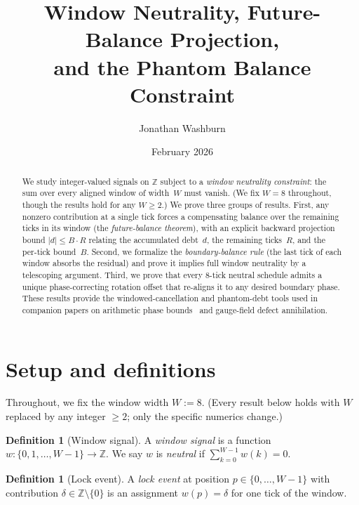 \documentclass[11pt]{amsart}
\title[Window Neutrality and Phantom Balance]{Window Neutrality, Future-Balance Projection,\\
and the Phantom Balance Constraint}
\author{Jonathan Washburn}
\date{February 2026}
\theoremstyle{definition}
\newtheorem{definition}[theorem]{Definition}
\theoremstyle{remark}
\newcommand{\Z}{\mathbb{Z}}
\begin{document}
\begin{abstract}
We study integer-valued signals on $\Z$ subject to a
\emph{window neutrality constraint}: the sum over every aligned
window of width~$W$ must vanish.  (We fix $W=8$ throughout, though the
results hold for any $W\ge2$.)  We prove three groups of results.
First, any nonzero contribution at a single tick forces a compensating
balance over the remaining ticks in its window
(the \emph{future-balance theorem}), with an explicit backward projection
bound $|d|\le B\cdot R$ relating the accumulated debt~$d$, the remaining
ticks~$R$, and the per-tick bound~$B$.
Second, we formalize the \emph{boundary-balance rule} (the last tick of
each window absorbs the residual) and prove it implies full window
neutrality by a telescoping argument.
Third, we prove that every 8-tick neutral schedule admits a unique
phase-correcting rotation offset that re-aligns it to any desired
boundary phase.
These results provide the windowed-cancellation and phantom-debt tools
used in companion papers on arithmetic phase bounds~\cite{F4} and
gauge-field defect annihilation.
\end{abstract}

\maketitle

\section{Setup and definitions}\label{sec:setup}

Throughout, we fix the window width $W:=8$.  (Every result below holds
with $W$ replaced by any integer $\ge2$; only the specific numerics change.)

\begin{definition}[Window signal]\label{def:window}
A \emph{window signal} is a function $w:\{0,1,\ldots,W{-}1\}\to\Z$.
We say $w$ is \emph{neutral} if $\sum_{k=0}^{W-1} w(k)=0$.
\end{definition}

\begin{definition}[Lock event]\label{def:lock}
A \emph{lock event} at position $p\in\{0,\ldots,W{-}1\}$ with
contribution $\delta\in\Z\setminus\{0\}$ is an assignment
$w(p)=\delta$ for one tick of the window.
\end{definition}
\end{document}
